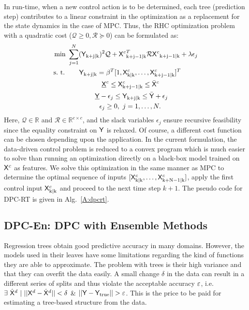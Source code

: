 In run-time, when a new control action is to be determined, each tree (prediction step) contributes to a linear constraint in the optimization as a replacement for the state dynamics in the case of MPC. Thus, the RHC optimization problem with a quadratic cost ($\mathcal{Q} \geq 0, \mathcal{R} \succeq 0$) can be formulated as:
\begin{align}
\begin{aligned}
\text{min } & \sum_{j=1}^{N} ({\mathsf{Y}}_{\mathrm{k+j|k}})^2 \mathcal{Q} + {\mathsf{X}^c}^T_{\mathrm{k+j-1|k}} \mathcal{R} {\mathsf{X}^c}_{\mathrm{k+j-1|k}} +  \lambda\epsilon_j\\
\text{s.~t. } & \ \ \ \ \ \mathsf{Y}_{\mathrm{k+j|k}} =  \beta^T [1,\mathsf{X}^c_{\mathrm{k|k}},\dots,\mathsf{X}^c_{\mathrm{k+j-1|k}} ]^T \\
& \ \ \ \ \ \ \ \ \ \ \ \ \ \ \ \underline{\mathsf{X}}^c \leq \mathsf{X}^c_{\mathrm{k+j-1|k}} \leq \bar{\mathsf{X}}^c\\ 
& \ \ \ \ \ \ \ \ \ \ \ \ \underline{\mathsf{Y}}-\epsilon_j \leq \mathsf{Y}_{\mathrm{k+j|k}} \leq \bar{\mathsf{Y}} + \epsilon_j\\\
& \ \ \ \ \ \ \ \ \ \ \ \ \ \ \epsilon_j \geq 0, \ j = 1,\dots,N.
\end{aligned}
\label{E:dpcrt}
\end{align}
Here, $\mathcal{Q} \in \mathbb{R}$ and $\mathcal{R} \in \mathbb{R}^{c \times c}$, and the slack variables $\epsilon_j$ ensure recursive feasibility since the equality constraint on $\mathsf{Y}$ is relaxed. Of course, a different cost function can be chosen depending upon the application. In the current formulation, the data-driven control problem is reduced to a convex program which is much easier to solve than running an optimization directly on a black-box model trained on $\mathsf{X}^c$ as features. We solve this optimization in the same manner as MPC to determine the optimal sequence of inputs $[\mathsf{X}^c_{\mathrm{k|k}},\dots,\mathsf{X}^c_{\mathrm{k+N-1|k}}]$, apply the first control input $\mathsf{X}^c_{\mathrm{k|k}}$ and proceed to the next time step $k+1$. The pseudo code for DPC-RT is given in Alg.~\ref{A:dpcrt}.

\subsection{DPC-En: DPC with Ensemble Methods}
\label{SS:dpcrf}
Regression trees obtain good predictive accuracy in many domains. However, the models used in their leaves have some limitations regarding the kind of functions they are able to approximate.
The problem with trees is their high variance and that they can overfit the data easily.
A small change $\delta$ in the data can result in a different series of splits and thus violate the acceptable accuracy $\varepsilon$, i.e. $\exists \  \hat{\tX}^d \ | \ ||\tX^d-\hat{\tX}^d|| < \delta$ \& $||\tY-\tY_{\mathrm{true}}||>\eps$.
This is the price to be paid for estimating a tree-based structure from the data.

